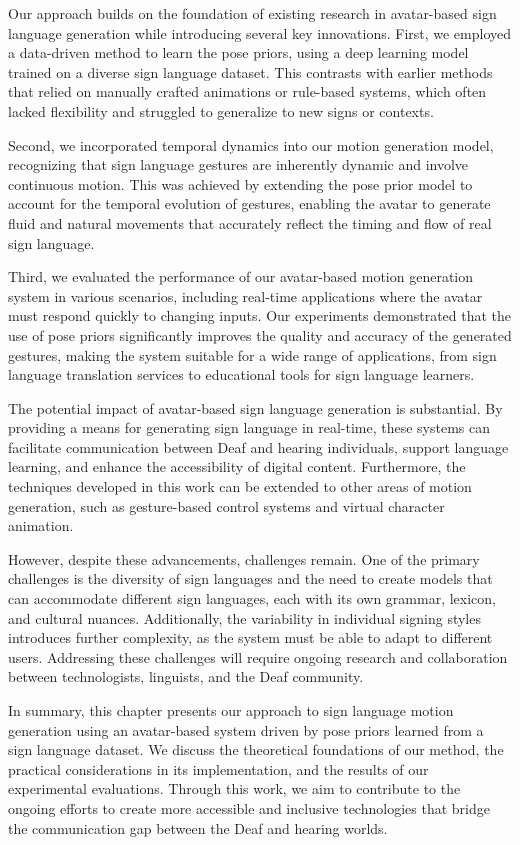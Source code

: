 \documentclass[../../main.tex]{subfiles}
\begin{document}
Our approach builds on the foundation of existing research in avatar-based sign language generation while introducing several key innovations. First, we employed a data-driven method to learn the pose priors, using a deep learning model trained on a diverse sign language dataset. This contrasts with earlier methods that relied on manually crafted animations or rule-based systems, which often lacked flexibility and struggled to generalize to new signs or contexts.

Second, we incorporated temporal dynamics into our motion generation model, recognizing that sign language gestures are inherently dynamic and involve continuous motion. This was achieved by extending the pose prior model to account for the temporal evolution of gestures, enabling the avatar to generate fluid and natural movements that accurately reflect the timing and flow of real sign language.

Third, we evaluated the performance of our avatar-based motion generation system in various scenarios, including real-time applications where the avatar must respond quickly to changing inputs. Our experiments demonstrated that the use of pose priors significantly improves the quality and accuracy of the generated gestures, making the system suitable for a wide range of applications, from sign language translation services to educational tools for sign language learners.

The potential impact of avatar-based sign language generation is substantial. By providing a means for generating sign language in real-time, these systems can facilitate communication between Deaf and hearing individuals, support language learning, and enhance the accessibility of digital content. Furthermore, the techniques developed in this work can be extended to other areas of motion generation, such as gesture-based control systems and virtual character animation.

However, despite these advancements, challenges remain. One of the primary challenges is the diversity of sign languages and the need to create models that can accommodate different sign languages, each with its own grammar, lexicon, and cultural nuances. Additionally, the variability in individual signing styles introduces further complexity, as the system must be able to adapt to different users. Addressing these challenges will require ongoing research and collaboration between technologists, linguists, and the Deaf community.

In summary, this chapter presents our approach to sign language motion generation using an avatar-based system driven by pose priors learned from a sign language dataset. We discuss the theoretical foundations of our method, the practical considerations in its implementation, and the results of our experimental evaluations. Through this work, we aim to contribute to the ongoing efforts to create more accessible and inclusive technologies that bridge the communication gap between the Deaf and hearing worlds.
\end{document}
